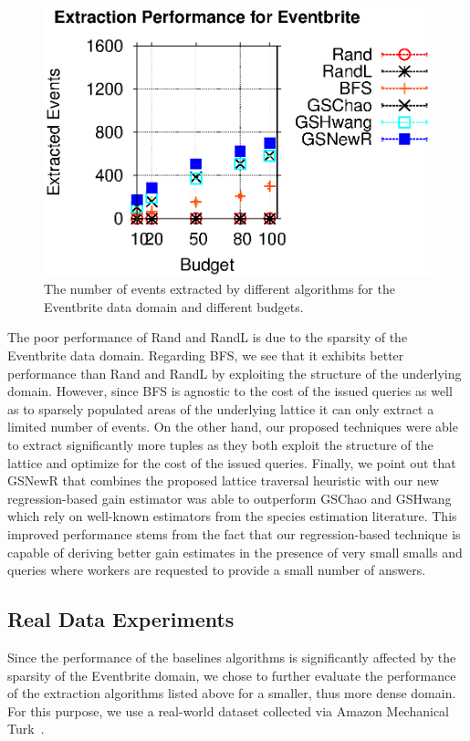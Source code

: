 \begin{figure}[h]
	\begin{center}
	\includegraphics[clip,scale=0.6]{figs/ebExtraction.eps}
	\caption{The number of events extracted by different algorithms for the Eventbrite data domain and different budgets.}
	\label{fig:ebextraction}
	\end{center}
\end{figure}

The poor performance of Rand and RandL is due to the sparsity of the Eventbrite data domain. Regarding BFS, we see that it exhibits better performance than Rand and RandL by exploiting the structure of the underlying domain. However, since BFS is agnostic to the cost of the issued queries as well as to sparsely populated areas of the underlying lattice it can only extract a limited number of events. On the other hand, our proposed techniques were able to extract significantly more tuples as they both exploit the structure of the lattice and optimize for the cost of the issued queries. Finally, we point out that GSNewR that combines the proposed lattice traversal heuristic with our new regression-based gain estimator was able to outperform GSChao and GSHwang which rely on well-known estimators from the species estimation literature. This improved performance stems from the fact that our regression-based technique is capable of deriving better gain estimates in the presence of very small smalls and queries where workers are requested to provide a small number of answers.


\subsection{Real Data Experiments}
\label{sec:realdata}
Since the performance of the baselines algorithms is significantly affected by the sparsity of the Eventbrite domain, we chose to further evaluate the performance of the extraction algorithms listed above for a smaller, thus more dense domain. For this purpose, we use a real-world dataset collected via Amazon Mechanical Turk~\cite{mturk}. 

